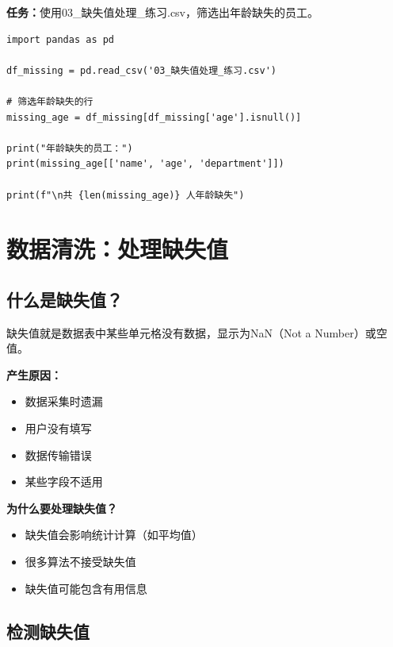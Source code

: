 \documentclass[12pt,a4paper]{article}
\begin{document}
\begin{practicebox}
\textbf{任务：}使用03\_缺失值处理\_练习.csv，筛选出年龄缺失的员工。

\begin{lstlisting}
import pandas as pd

df_missing = pd.read_csv('03_缺失值处理_练习.csv')

# 筛选年龄缺失的行
missing_age = df_missing[df_missing['age'].isnull()]

print("年龄缺失的员工：")
print(missing_age[['name', 'age', 'department']])

print(f"\n共 {len(missing_age)} 人年龄缺失")
\end{lstlisting}
\end{practicebox}

\section{数据清洗：处理缺失值}

\subsection{什么是缺失值？}

\begin{knowledgebox}[缺失值介绍]
缺失值就是数据表中某些单元格没有数据，显示为NaN（Not a Number）或空值。

\textbf{产生原因：}
\begin{itemize}
    \item 数据采集时遗漏
    \item 用户没有填写
    \item 数据传输错误
    \item 某些字段不适用
\end{itemize}

\textbf{为什么要处理缺失值？}
\begin{itemize}
    \item 缺失值会影响统计计算（如平均值）
    \item 很多算法不接受缺失值
    \item 缺失值可能包含有用信息
\end{itemize}
\end{knowledgebox}

\subsection{检测缺失值}
\end{document}
